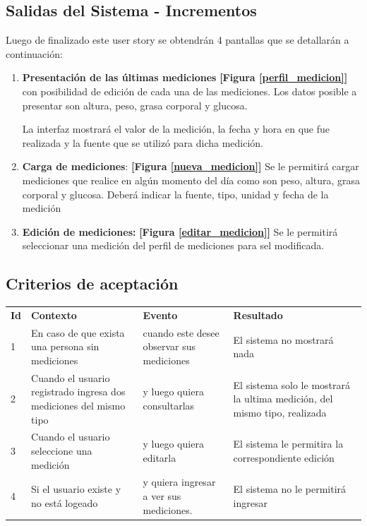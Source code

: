 \subsection {Salidas del Sistema - Incrementos}

Luego de finalizado este user story se obtendrán 4 pantallas que se detallarán a continuación:
\begin{enumerate}
    \item \textbf{Presentación de las últimas mediciones}  \textbf{[Figura  \ref{perfil_medicion}]} con posibilidad de edición de cada una de las mediciones. Los datos posible  a presentar son altura, peso, grasa corporal y glucosa. 
    
    La interfaz mostrará el valor de la medición, la fecha y hora en que fue realizada y la fuente que se utilizó para dicha medición.
	\item \textbf{Carga de mediciones}: \textbf{[Figura \ref{nueva_medicion}]} Se le permitirá cargar mediciones que realice en algún momento del día como son peso, altura, grasa corporal y glucosa. Deberá indicar la fuente, tipo, unidad y fecha de la medición
    \item \textbf{Edición de mediciones:}  \textbf{[Figura \ref{editar_medicion}]} Se le permitirá seleccionar una medición del perfil de mediciones para sel modificada.

\end{enumerate}

    




\subsection{Criterios de aceptación}

\begin{center}
\begin{longtable}{|p{0.5cm}|p{4cm}|p{4cm}|p{5cm}|}
\hline \hline \rowcolor[gray]{0.9}
	\multicolumn{4}{||c|}{\textbf{Criterio de aceptación}} \\
    \hline  \rowcolor[gray]{0.9}
        \textbf{Id} &
        \textbf{Contexto} &
        \textbf{Evento}&
        \textbf{Resultado} \\
    \hline
1&En caso de que exista una persona sin mediciones & cuando este desee observar sus mediciones  & El sistema no mostrará nada \\ \hline
 
2& Cuando el usuario registrado ingresa dos mediciones del mismo tipo  & y luego quiera consultarlas & El sistema solo le mostrará la ultima medición, del mismo tipo, realizada\\ \hline

3& Cuando el usuario seleccione una medición & y luego quiera editarla & El sistema le permitira la correspondiente edición\\ \hline

4& Si el usuario existe y no está logeado & y quiera ingresar a ver sus mediciones. & El sistema no le permitirá ingresar\\ \hline
  \end{longtable}
\end{center}


